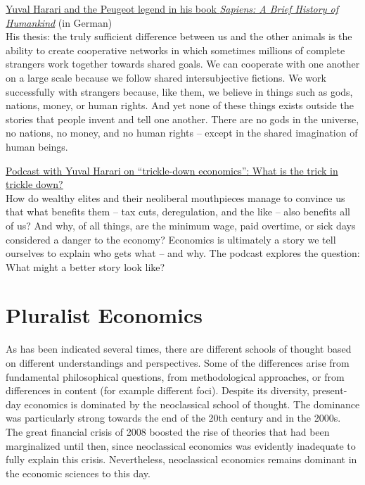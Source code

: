 \documentclass[
  british,
  a4paper,
  DIV=11,
  numbers=noendperiod,
  oneside,
  openany]{scrreprt}
\newcounter{none} %
\begin{document}
\begin{tcolorbox}[enhanced jigsaw, arc=.35mm, bottomrule=.15mm, bottomtitle=1mm, breakable, colback=white, colbacktitle=quarto-callout-note-color!10!white, colframe=quarto-callout-note-color-frame, coltitle=black, left=2mm, leftrule=.75mm, opacityback=0, opacitybacktitle=0.6, rightrule=.15mm, title={Further reading}, titlerule=0mm, toprule=.15mm, toptitle=1mm]

\href{https://ilias.unibe.ch/go/file/3803488}{Yuval Harari and the
Peugeot legend in his book \emph{Sapiens: A Brief History of Humankind}}
(in German)\\
His thesis: the truly sufficient difference between us and the other
animals is the ability to create cooperative networks in which sometimes
millions of complete strangers work together towards shared goals. We
can cooperate with one another on a large scale because we follow shared
intersubjective fictions. We work successfully with strangers because,
like them, we believe in things such as gods, nations, money, or human
rights. And yet none of these things exists outside the stories that
people invent and tell one another. There are no gods in the universe,
no nations, no money, and no human rights -- except in the shared
imagination of human beings.

\href{https://pitchforkeconomics.com/episode/what-is-the-trick-in-trickle-down/}{Podcast
with Yuval Harari on ``trickle-down economics'': What is the trick in
trickle down?}\\
How do wealthy elites and their neoliberal mouthpieces manage to
convince us that what benefits them -- tax cuts, deregulation, and the
like -- also benefits all of us? And why, of all things, are the minimum
wage, paid overtime, or sick days considered a danger to the economy?
Economics is ultimately a story we tell ourselves to explain who gets
what -- and why. The podcast explores the question: What might a better
story look like?

\end{tcolorbox}

\section{Pluralist Economics}\label{pluralist-economics}

As has been indicated several times, there are different schools of
thought based on different understandings and perspectives. Some of the
differences arise from fundamental philosophical questions, from
methodological approaches, or from differences in content (for example
different foci). Despite its diversity, present-day economics is
dominated by the neoclassical school of thought. The dominance was
particularly strong towards the end of the 20th century and in the
2000s. The great financial crisis of 2008 boosted the rise of theories
that had been marginalized until then, since neoclassical economics was
evidently inadequate to fully explain this crisis. Nevertheless,
neoclassical economics remains dominant in the economic sciences to this
day.
\end{document}
